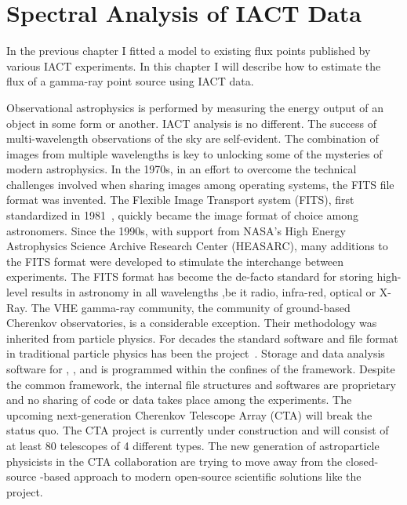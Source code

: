 \chapter{Spectral Analysis of IACT Data}
\label{ch:spectral}


In the previous chapter I fitted a model to existing flux points published by various IACT experiments. 
In this chapter I will describe how to estimate the flux of a gamma-ray point source using IACT data.

Observational astrophysics is performed by measuring the energy output of an object in some form or another. IACT analysis is no different.
The success of multi-wavelength observations of the sky are self-evident. The combination of images from 
multiple wavelengths is key to unlocking some of the mysteries of modern astrophysics. 
In the 1970s, in an effort to overcome the technical challenges involved when sharing images among operating systems, the FITS 
file format was invented. The Flexible Image Transport system (FITS), first standardized in 1981~\cite{fits_1981},
quickly became the image format of choice among astronomers.
Since the 1990s, with support from NASA's  High Energy Astrophysics Science Archive Research Center (HEASARC), many additions to the FITS format were developed to 
stimulate the interchange between experiments. The FITS format has become the de-facto standard for storing high-level results in astronomy in all wavelengths 
,be it radio, infra-red, optical or X-Ray.
The VHE gamma-ray community, the community of ground-based Cherenkov observatories, is a considerable exception. Their methodology 
was inherited from particle physics.  For decades the standard software and file format in traditional particle physics has been the \rootcern project~\cite{rootcern}. 
Storage and data analysis software for \hess, \magic, and \veritas is programmed within the confines of the \rootcern framework. Despite the common framework, 
the internal file structures and softwares are proprietary and no sharing of code or data takes place among the experiments.
The upcoming next-generation Cherenkov Telescope Array (CTA) will break the status quo. 
The CTA project is currently under construction and will consist of at least 80 telescopes of 4 different types. 
The new generation of astroparticle physicists in the CTA collaboration are trying to move 
away from the closed-source \rootcern-based approach to modern open-source scientific solutions like the \gammapy~\cite{gammapy} project.
